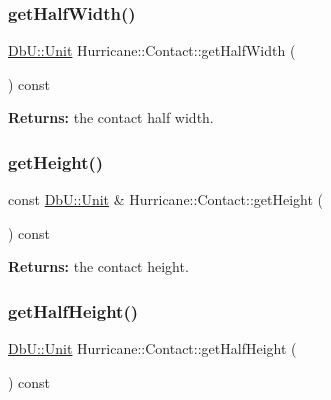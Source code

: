 \subsubsection{\texorpdfstring{get\+Half\+Width()}{getHalfWidth()}}
{\footnotesize\ttfamily \hyperlink{group__DbUGroup_ga4fbfa3e8c89347af76c9628ea06c4146}{Db\+U\+::\+Unit} Hurricane\+::\+Contact\+::get\+Half\+Width (\begin{DoxyParamCaption}{ }\end{DoxyParamCaption}) const\hspace{0.3cm}{\ttfamily [inline]}}

{\bfseries Returns\+:} the contact half width. \mbox{\label{classHurricane_1_1Contact_adf6487485a4f48bd15aa6f9a8ac5fd27}} 
\subsubsection{\texorpdfstring{get\+Height()}{getHeight()}}
{\footnotesize\ttfamily const \hyperlink{group__DbUGroup_ga4fbfa3e8c89347af76c9628ea06c4146}{Db\+U\+::\+Unit} \& Hurricane\+::\+Contact\+::get\+Height (\begin{DoxyParamCaption}{ }\end{DoxyParamCaption}) const\hspace{0.3cm}{\ttfamily [inline]}}

{\bfseries Returns\+:} the contact height. \mbox{\label{classHurricane_1_1Contact_aebd3ff8e1368617ab750b20ae9ffb59b}} 
\subsubsection{\texorpdfstring{get\+Half\+Height()}{getHalfHeight()}}
{\footnotesize\ttfamily \hyperlink{group__DbUGroup_ga4fbfa3e8c89347af76c9628ea06c4146}{Db\+U\+::\+Unit} Hurricane\+::\+Contact\+::get\+Half\+Height (\begin{DoxyParamCaption}{ }\end{DoxyParamCaption}) const\hspace{0.3cm}{\ttfamily [inline]}}

